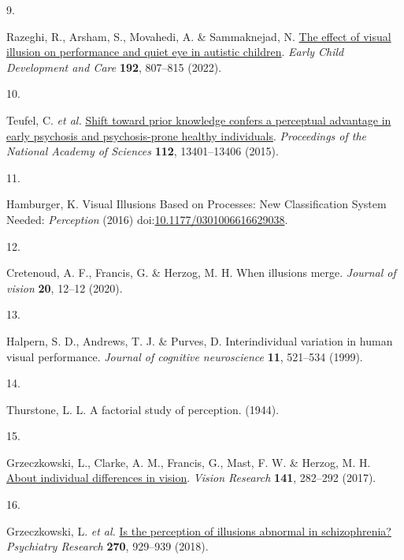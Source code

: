 \documentclass[
  man,floatsintext]{apa6}
\newlength{\cslhangindent}
\newlength{\csllabelwidth}
\newlength{\cslentryspacingunit} %
\newenvironment{CSLReferences}[2] %
 {%
  \setlength{\parindent}{0pt}
  \ifodd #1
  \let\oldpar\par
  \def\par{\hangindent=\cslhangindent\oldpar}
  \fi
  \setlength{\parskip}{#2\cslentryspacingunit}
 }%
 {}
\newcommand{\CSLLeftMargin}[1]{\parbox[t]{\csllabelwidth}{#1}}
\newcommand{\CSLRightInline}[1]{\parbox[t]{\linewidth - \csllabelwidth}{#1}\break}
\begin{document}
\begin{CSLReferences}{0}{0}
\leavevmode{}%
\CSLLeftMargin{9. }%
\CSLRightInline{Razeghi, R., Arsham, S., Movahedi, A. \& Sammaknejad, N. \href{https://doi.org/10.1080/03004430.2020.1802260}{The effect of visual illusion on performance and quiet eye in autistic children}. \emph{Early Child Development and Care} \textbf{192}, 807--815 (2022).}

\leavevmode{}%
\CSLLeftMargin{10. }%
\CSLRightInline{Teufel, C. \emph{et al.} \href{https://doi.org/10.1073/pnas.1503916112}{Shift toward prior knowledge confers a perceptual advantage in early psychosis and psychosis-prone healthy individuals}. \emph{Proceedings of the National Academy of Sciences} \textbf{112}, 13401--13406 (2015).}

\leavevmode{}%
\CSLLeftMargin{11. }%
\CSLRightInline{Hamburger, K. Visual Illusions Based on Processes: New Classification System Needed: \emph{Perception} (2016) doi:\href{https://doi.org/10.1177/0301006616629038}{10.1177/0301006616629038}.}

\leavevmode{}%
\CSLLeftMargin{12. }%
\CSLRightInline{Cretenoud, A. F., Francis, G. \& Herzog, M. H. When illusions merge. \emph{Journal of vision} \textbf{20}, 12--12 (2020).}

\leavevmode{}%
\CSLLeftMargin{13. }%
\CSLRightInline{Halpern, S. D., Andrews, T. J. \& Purves, D. Interindividual variation in human visual performance. \emph{Journal of cognitive neuroscience} \textbf{11}, 521--534 (1999).}

\leavevmode{}%
\CSLLeftMargin{14. }%
\CSLRightInline{Thurstone, L. L. A factorial study of perception. (1944).}

\leavevmode{}%
\CSLLeftMargin{15. }%
\CSLRightInline{Grzeczkowski, L., Clarke, A. M., Francis, G., Mast, F. W. \& Herzog, M. H. \href{https://doi.org/10.1016/j.visres.2016.10.006}{About individual differences in vision}. \emph{Vision Research} \textbf{141}, 282--292 (2017).}

\leavevmode{}%
\CSLLeftMargin{16. }%
\CSLRightInline{Grzeczkowski, L. \emph{et al.} \href{https://doi.org/10.1016/j.psychres.2018.10.063}{Is the perception of illusions abnormal in schizophrenia?} \emph{Psychiatry Research} \textbf{270}, 929--939 (2018).}


\end{CSLReferences}
\end{document}
